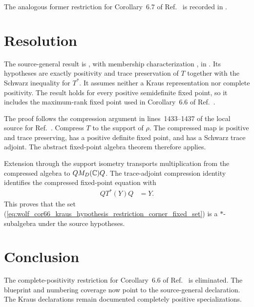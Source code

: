 \documentclass[11pt]{article}
\begin{document}
The analogous former restriction for Corollary~6.7 of
Ref.~\cite{Wolf2012Quantum} is recorded in
.

\section{Resolution}

The source-general result is
, with
membership characterization
,
in
. Its
hypotheses are exactly positivity and trace preservation of $T$ together with
the Schwarz inequality for $T^*$. It assumes neither a Kraus representation
nor complete positivity. The result holds for every positive semidefinite
fixed point, so it includes the maximum-rank fixed point used in
Corollary~6.6 of Ref.~\cite{Wolf2012Quantum}.

The proof follows the compression argument in lines~1433--1437 of the local
source for Ref.~\cite{Wolf2012Quantum}. Compress $T$ to the support of
$\rho$. The compressed map is positive and trace preserving, has a positive
definite fixed point, and has a Schwarz trace adjoint. The abstract fixed-point
algebra theorem  therefore
applies.

Extension through the support isometry transports multiplication from the
compressed algebra to $QM_{D}(\mathbb{C})Q$. The trace-adjoint compression identity
identifies the compressed fixed-point equation with
\begin{align}
    QT^*(Y)Q
        &=Y.
    \label{eq:wolf_cor66_kraus_hypothesis_restriction_compressed_fixed_equation}
\end{align}
This proves that the set
(\ref{eq:wolf_cor66_kraus_hypothesis_restriction_corner_fixed_set}) is a
$*$-subalgebra under the source hypotheses.

\section{Conclusion}

The complete-positivity restriction for Corollary~6.6 of
Ref.~\cite{Wolf2012Quantum} is eliminated. The blueprint and numbering
coverage now point to the source-general declaration. The Kraus declarations
remain documented completely positive specializations.



\end{document}
